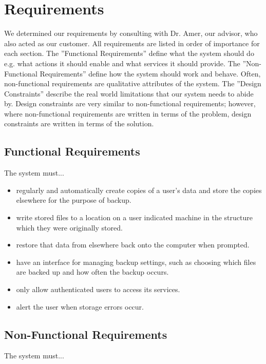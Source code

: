 \chapter {Requirements}

We determined our requirements by consulting with Dr. Amer, our advisor, who also acted as our customer.  All requirements are listed in order of importance for each section.  The ''Functional Requirements'' define what the system should do e.g. what actions it should enable and what services it should provide.  The ''Non-Functional Requirements'' define how the system should work and behave.  Often, non-functional requirements are qualitative attributes of the system.  The ''Design Constraints'' describe the real world limitations that our system needs to abide by.  Design constraints are very similar to non-functional requirements; however, where non-functional requirements are written in terms of the problem, design constraints are written in terms of the solution.

\section {Functional Requirements}
	The system must...

	\begin{itemize}
		\item regularly and automatically create copies of a user's data and store the copies elsewhere for the purpose of backup.

		\item write stored files to a location on a user indicated machine in the structure which they were originally stored.

		\item restore that data from elsewhere back onto the computer when prompted.

		\item have an interface for managing backup settings, such as choosing which files are backed up and how often the backup occurs.

		\item only allow authenticated users to access its services.

		\item alert the user when storage errors occur.

	\end{itemize}

\section {Non-Functional Requirements}
	The system must...

